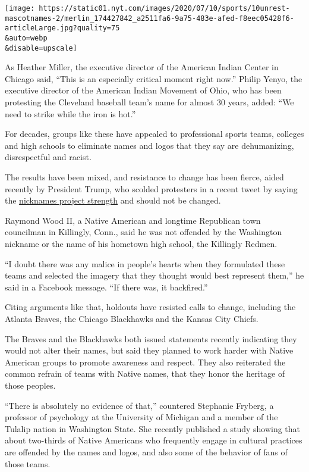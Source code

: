 \texttt{[image: https://static01.nyt.com/images/2020/07/10/sports/10unrest-mascotnames-2/merlin\_174427842\_a2511fa6-9a75-483e-afed-f8eec05428f6-articleLarge.jpg?quality=75\\\&auto=webp\\\&disable=upscale]}

As Heather Miller, the executive director of the American Indian Center
in Chicago said, ``This is an especially critical moment right now.''
Philip Yenyo, the executive director of the American Indian Movement of
Ohio, who has been protesting the Cleveland baseball team's name for
almost 30 years, added: ``We need to strike while the iron is hot.''

For decades, groups like these have appealed to professional sports
teams, colleges and high schools to eliminate names and logos that they
say are dehumanizing, disrespectful and racist.

The results have been mixed, and resistance to change has been fierce,
aided recently by President Trump, who scolded protesters in a recent
tweet by saying the
\href{https://www.nytimes.com/2020/07/06/us/politics/trump-bubba-wallace-nascar.html}{nicknames
project strength} and should not be changed.

Raymond Wood II, a Native American and longtime Republican town
councilman in Killingly, Conn., said he was not offended by the
Washington nickname or the name of his hometown high school, the
Killingly Redmen.

``I doubt there was any malice in people's hearts when they formulated
these teams and selected the imagery that they thought would best
represent them,'' he said in a Facebook message. ``If there was, it
backfired.''

Citing arguments like that, holdouts have resisted calls to change,
including the Atlanta Braves, the Chicago Blackhawks and the Kansas City
Chiefs.

The Braves and the Blackhawks both issued statements recently indicating
they would not alter their names, but said they planned to work harder
with Native American groups to promote awareness and respect. They also
reiterated the common refrain of teams with Native names, that they
honor the heritage of those peoples.

``There is absolutely no evidence of that,'' countered Stephanie
Fryberg, a professor of psychology at the University of Michigan and a
member of the Tulalip nation in Washington State. She recently published
a study showing that about two-thirds of Native Americans who frequently
engage in cultural practices are offended by the names and logos, and
also some of the behavior of fans of those teams.

